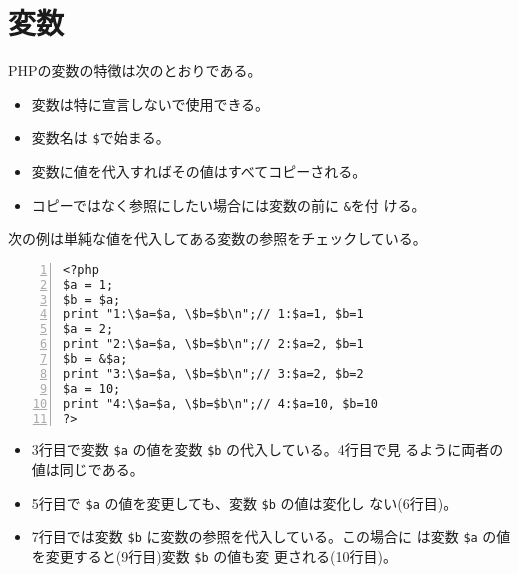 \section{変数}
PHPの変数の特徴は次のとおりである。
\begin{itemize}
 \item 変数は特に宣言しないで使用できる。
 \item 変数名は \texttt{\$}で始まる。
 \item 変数に値を代入すればその値はすべてコピーされる。
 \item コピーではなく参照にしたい場合には変数の前に \texttt{\&}を付
ける。
\end{itemize}
\begin{Exec}\upshape\label{PHPsubstitute}
次の例は単純な値を代入してある変数の参照をチェックしている。
\begin{Verbatim}[numbers=left]
<?php
$a = 1;
$b = $a;
print "1:\$a=$a, \$b=$b\n";// 1:$a=1, $b=1
$a = 2;
print "2:\$a=$a, \$b=$b\n";// 2:$a=2, $b=1
$b = &$a;
print "3:\$a=$a, \$b=$b\n";// 3:$a=2, $b=2
$a = 10;
print "4:\$a=$a, \$b=$b\n";// 4:$a=10, $b=10
?>
\end{Verbatim}
 \begin{itemize}
  \item 3行目で変数 \Verb+$a+ の値を変数 \Verb+$b+ の代入している。4行目で見
        るように両者の値は同じである。
  \item 5行目で \Verb+$a+ の値を変更しても、変数 \Verb+$b+ の値は変化し
        ない(6行目)。
  \item 7行目では変数 \Verb+$b+ に変数の参照を代入している。この場合に
        は変数 \Verb+$a+ の値を変更すると(9行目)変数 \Verb+$b+ の値も変
        更される(10行目)。
 \end{itemize}
 \end{Exec}
 \iffalse
